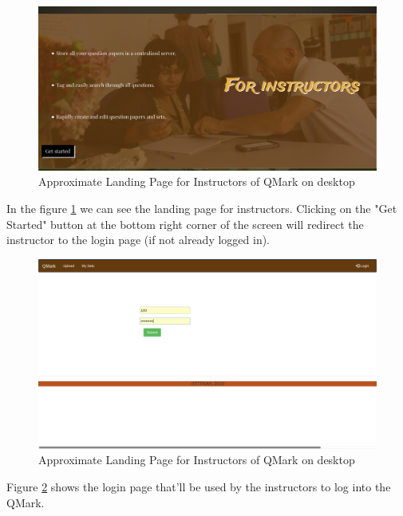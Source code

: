 \documentclass[13pt]{article}
\begin{document}
\begin{figure}[H]
    \includegraphics[width=\textwidth,height=\textheight,keepaspectratio]{2.png}
    
    \caption{Approximate Landing Page for Instructors of QMark on desktop}
    \label{fig:inst_landingpage}
\end{figure}

In the figure \ref{fig:inst_landingpage} we can see the landing page for instructors. Clicking on the "Get Started" button at the bottom right corner of the screen will redirect the instructor to the login page (if not already logged in).

\begin{figure}[H]
    \includegraphics[width=\textwidth,height=\textheight,keepaspectratio]{4.png}
    
    \caption{Approximate Landing Page for Instructors of QMark on desktop}
    \label{fig:inst_loginpage}
\end{figure}

Figure \ref{fig:inst_loginpage} shows the login page that'll be used by the instructors to log into the QMark.
\end{document}
